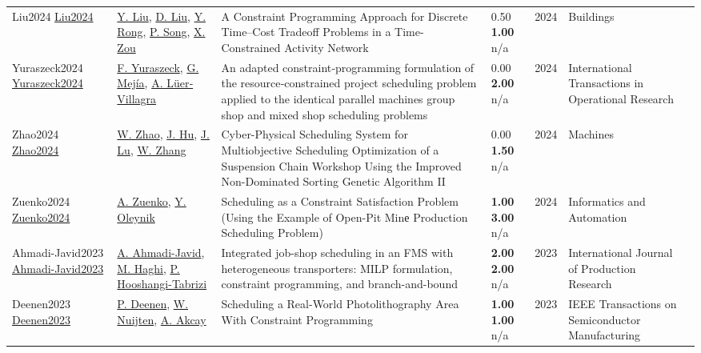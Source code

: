 {\begin{longtable}{p{3cm}p{5cm}p{10cm}p{1cm}rp{2.5cm}l}
Liu2024 \href{https://doi.org/10.3390/buildings14072073}{Liu2024} & \hyperref[auth:a2168]{Y. Liu}, \hyperref[auth:a2169]{D. Liu}, \hyperref[auth:a2170]{Y. Rong}, \hyperref[auth:a2171]{P. Song}, \hyperref[auth:a755]{X. Zou} & \cellcolor{gold!20}A Constraint Programming Approach for Discrete Time–Cost Tradeoff Problems in a Time-Constrained Activity Network & \noindent{}0.50 \textbf{1.00} n/a & 2024 & Buildings & \cite{Liu2024}\\
Yuraszeck2024 \href{https://doi.org/10.1111/itor.13504}{Yuraszeck2024} & \hyperref[auth:a405]{F. Yuraszeck}, \hyperref[auth:a741]{G. Mejía}, \hyperref[auth:a2142]{A. Lüer‐Villagra} & An adapted constraint‐programming formulation of the resource‐constrained project scheduling problem applied to the identical parallel machines group shop and mixed shop scheduling problems & \noindent{}\textcolor{black!50}{0.00} \textbf{2.00} n/a & 2024 & International Transactions in Operational Research & \cite{Yuraszeck2024}\\
Zhao2024 \href{https://doi.org/10.3390/machines12090666}{Zhao2024} & \hyperref[auth:a2154]{W. Zhao}, \hyperref[auth:a2155]{J. Hu}, \hyperref[auth:a2156]{J. Lu}, \hyperref[auth:a2157]{W. Zhang} & \cellcolor{gold!20}Cyber-Physical Scheduling System for Multiobjective Scheduling Optimization of a Suspension Chain Workshop Using the Improved Non-Dominated Sorting Genetic Algorithm II & \noindent{}\textcolor{black!50}{0.00} \textbf{1.50} n/a & 2024 & Machines & \cite{Zhao2024}\\
Zuenko2024 \href{https://doi.org/10.15622/ia.23.5.1}{Zuenko2024} & \hyperref[auth:a1991]{A. Zuenko}, \hyperref[auth:a1992]{Y. Oleynik} & \cellcolor{gold!20}Scheduling as a Constraint Satisfaction Problem (Using the Example of Open-Pit Minе Production Scheduling Problem) & \noindent{}\textbf{1.00} \textbf{3.00} n/a & 2024 & Informatics and Automation & \cite{Zuenko2024}\\
Ahmadi-Javid2023 \href{http://dx.doi.org/10.1080/00207543.2023.2230489}{Ahmadi-Javid2023} & \hyperref[auth:a1759]{A. Ahmadi-Javid}, \hyperref[auth:a1760]{M. Haghi}, \hyperref[auth:a1761]{P. Hooshangi-Tabrizi} & Integrated job-shop scheduling in an FMS with heterogeneous transporters: MILP formulation, constraint programming, and branch-and-bound & \noindent{}\textbf{2.00} \textbf{2.00} n/a & 2023 & \cellcolor{red!20}International Journal of Production Research & \cite{Ahmadi-Javid2023}\\
Deenen2023 \href{https://doi.org/10.1109/tsm.2023.3304517}{Deenen2023} & \hyperref[auth:a2202]{P. Deenen}, \hyperref[auth:a655]{W. Nuijten}, \hyperref[auth:a2203]{A. Akcay} & Scheduling a Real-World Photolithography Area With Constraint Programming & \noindent{}\textbf{1.00} \textbf{1.00} n/a & 2023 & IEEE Transactions on Semiconductor Manufacturing & \cite{Deenen2023}\\

\end{longtable}}
